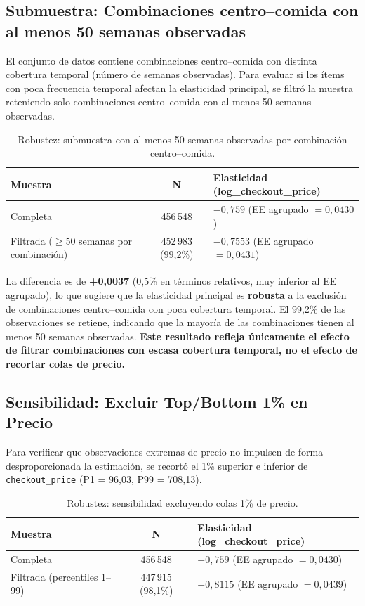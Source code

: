 \documentclass[doc, a4paper, biblatex, floatsintext, longtable, babel]{apa7}
\begin{document}
\subsection{Submuestra: Combinaciones centro--comida con al menos 50 semanas observadas}
\label{subsec:submuestra_50obs}

El conjunto de datos contiene combinaciones centro--comida con distinta cobertura temporal (número de semanas observadas). Para evaluar si los ítems con poca frecuencia temporal afectan la elasticidad principal, se filtró la muestra reteniendo solo combinaciones centro--comida con al menos 50 semanas observadas.

\begin{table}[!htbp]
\centering
\caption{Robustez: submuestra con al menos 50 semanas observadas por combinación centro--comida.}
\label{tab:submuestra_50obs}
\begin{tabular}{lcp{4.5cm}}
\toprule
Muestra & N & Elasticidad (log\_checkout\_price) \\
\midrule
Completa & 456\,548 & $-0,759$ (EE agrupado $=0,0430$) \\
Filtrada ($\ge$50 semanas por combinación) & 452\,983 (99,2\%) & $-0,7553$ (EE agrupado $=0,0431$) \\
\bottomrule
\end{tabular}
\end{table}

La diferencia es de \textbf{+0,0037} (0,5\% en términos relativos, muy inferior al EE agrupado), lo que sugiere que la elasticidad principal es \textbf{robusta} a la exclusión de combinaciones centro--comida con poca cobertura temporal. El 99,2\% de las observaciones se retiene, indicando que la mayoría de las combinaciones tienen al menos 50 semanas observadas. \textbf{Este resultado refleja únicamente el efecto de filtrar combinaciones con escasa cobertura temporal, no el efecto de recortar colas de precio.}

\subsection{Sensibilidad: Excluir Top/Bottom 1\% en Precio}
\label{subsec:sensibilidad_outliers}

Para verificar que observaciones extremas de precio no impulsen de forma desproporcionada la estimación, se recortó el 1\% superior e inferior de \texttt{checkout\_price} (P1 = 96,03, P99 = 708,13).

\begin{table}[!htbp]
\centering
\caption{Robustez: sensibilidad excluyendo colas 1\% de precio.}
\label{tab:sensibilidad_outliers}
\begin{tabular}{lcp{4.5cm}}
\toprule
Muestra & N & Elasticidad (log\_checkout\_price) \\
\midrule
Completa & 456\,548 & $-0,759$ (EE agrupado $=0,0430$) \\
Filtrada (percentiles 1--99) & 447\,915 (98,1\%) & $-0,8115$ (EE agrupado $=0,0439$) \\
\bottomrule
\end{tabular}
\end{table}
\end{document}
